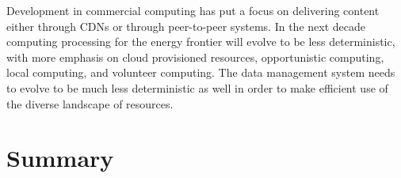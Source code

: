Development in commercial computing has put a focus on delivering
content either through CDNs or through peer-to-peer systems.  In the
next decade computing processing for the energy frontier will evolve
to be less deterministic, with more emphasis on cloud provisioned
resources, opportunistic computing, local computing, and volunteer
computing.  The data management system needs to evolve to be much less
deterministic as well in order to make efficient use of the diverse
landscape of resources.


\section{Summary}
\label{sec:comp-summary}




